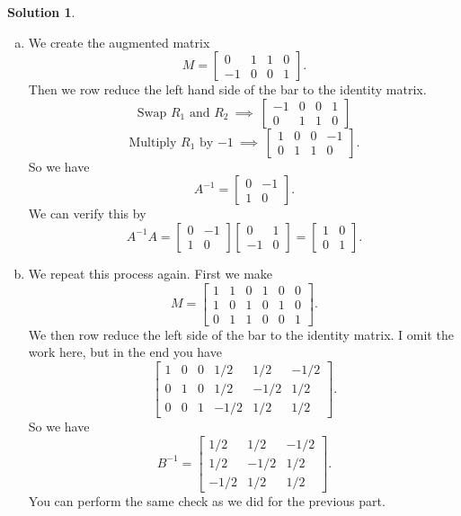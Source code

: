 \documentclass[12pt]{report} %
\theoremstyle{definition}
\newtheorem{solution}{Solution}
\begin{document}
\begin{solution}
\begin{enumerate}[(a)]
    \item We create the augmented matrix
    \[
    M=\left[\begin{array}{cc|cc}
        0 & 1 & 1 & 0\\
        -1 & 0 & 0 & 1
    \end{array}\right].
    \]
    Then we row reduce the left hand side of the bar to the identity matrix.
    \[
    \textrm{Swap $R_1$ and $R_2$} ~\implies ~ \left[ \begin{array}{cc|cc}
        -1 & 0 & 0 & 1\\
        0 & 1 & 1 & 0
    \end{array}\right]
    \]
    \[
    \textrm{Multiply $R_1$ by $-1$} ~\implies ~ \left[ \begin{array}{cc|cc}
        1 & 0 & 0 & -1\\
        0 & 1 & 1 & 0
    \end{array}\right].
    \]
    So we have
    \[
    A^{-1}=\begin{bmatrix} 0 & -1\\ 1 & 0\end{bmatrix}.
    \]
    We can verify this by
    \[
    A^{-1}A = \begin{bmatrix} 0 & -1 \\ 1 & 0 \end{bmatrix} \begin{bmatrix} 0 & 1\\ -1 & 0 \end{bmatrix} = \begin{bmatrix} 1 & 0 \\ 0 & 1 \end{bmatrix}.
    \]
    
    \item We repeat this process again.  First we make
    \[
    M= \left[ \begin{array}{ccc|ccc}
        1 & 1 & 0 & 1 & 0 & 0\\
        1 & 0 & 1 & 0 & 1 & 0\\
        0 & 1 & 1 & 0 & 0 & 1
    \end{array}
    \right].
    \]
    We then row reduce the left side of the bar to the identity matrix.  I omit the work here, but in the end you have
    \[
    \left[ \begin{array}{ccc|ccc|}
        1 & 0 & 0 & 1/2 & 1/2 & -1/2\\
        0 & 1 & 0 & 1/2 & -1/2 & 1/2\\
        0 & 0 & 1 & -1/2 & 1/2 & 1/2
    \end{array}\right].
    \]
    So we have
    \[
    B^{-1}=\begin{bmatrix} 1/2 & 1/2 & -1/2 \\ 1/2 & -1/2 & 1/2 \\ -1/2 & 1/2 & 1/2 \end{bmatrix}.
    \]
    You can perform the same check as we did for the previous part.
\end{enumerate}
\end{solution}
\end{document}
